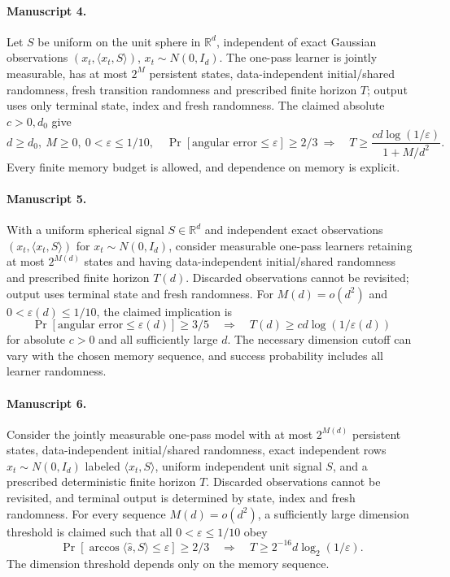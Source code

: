 \documentclass[11pt]{article}
\begin{document}
\paragraph{Manuscript 4.}
Let $S$ be uniform on the unit sphere in $\mathbb R^d$, independent of exact Gaussian observations $(x_t,\langle x_t,S\rangle)$, $x_t\sim N(0,I_d)$. The one-pass learner is jointly measurable, has at most $2^M$ persistent states, data-independent initial/shared randomness, fresh transition randomness and prescribed finite horizon $T$; output uses only terminal state, index and fresh randomness. The claimed absolute $c>0,d_0$ give
\[
 d\ge d_0,\ M\ge0,\ 0<\varepsilon\le1/10,\quad
 \Pr[\text{angular error}\le\varepsilon]\ge2/3
 \ \Rightarrow\quad T\ge\frac{c d\log(1/\varepsilon)}{1+M/d^2}.
\]
Every finite memory budget is allowed, and dependence on memory is explicit.

\paragraph{Manuscript 5.}
With a uniform spherical signal $S\in\mathbb R^d$ and independent exact observations $(x_t,\langle x_t,S\rangle)$ for $x_t\sim N(0,I_d)$, consider measurable one-pass learners retaining at most $2^{M(d)}$ states and having data-independent initial/shared randomness and prescribed finite horizon $T(d)$. Discarded observations cannot be revisited; output uses terminal state and fresh randomness. For $M(d)=o(d^2)$ and $0<\varepsilon(d)\le1/10$, the claimed implication is
\[
 \Pr[\text{angular error}\le\varepsilon(d)]\ge3/5
 \quad\Longrightarrow\quad T(d)\ge c d\log(1/\varepsilon(d))
\]
for absolute $c>0$ and all sufficiently large $d$. The necessary dimension cutoff can vary with the chosen memory sequence, and success probability includes all learner randomness.

\paragraph{Manuscript 6.}
Consider the jointly measurable one-pass model with at most $2^{M(d)}$ persistent states, data-independent initial/shared randomness, exact independent rows $x_t\sim N(0,I_d)$ labeled $\langle x_t,S\rangle$, uniform independent unit signal $S$, and a prescribed deterministic finite horizon $T$. Discarded observations cannot be revisited, and terminal output is determined by state, index and fresh randomness. For every sequence $M(d)=o(d^2)$, a sufficiently large dimension threshold is claimed such that all $0<\varepsilon\le1/10$ obey
\[
 \Pr[\arccos\langle\widehat s,S\rangle\le\varepsilon]\ge2/3
 \quad\Longrightarrow\quad T\ge2^{-16}d\log_2(1/\varepsilon).
\]
The dimension threshold depends only on the memory sequence.
\end{document}
